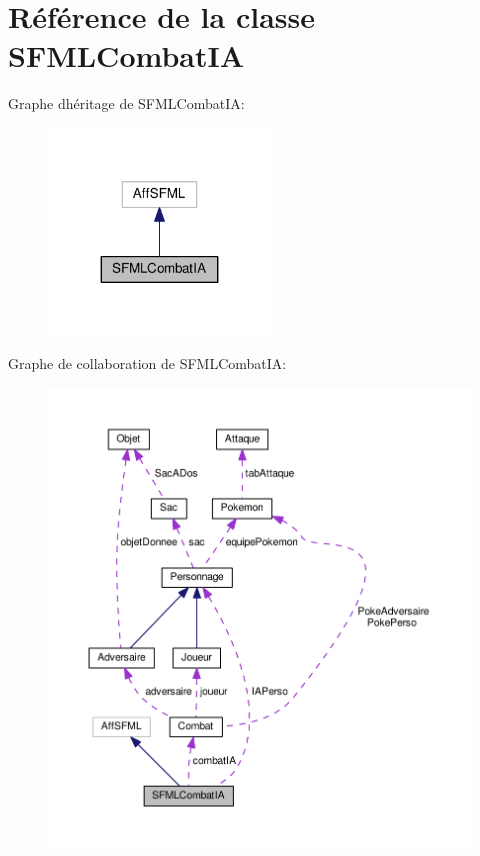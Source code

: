 \hypertarget{class_s_f_m_l_combat_i_a}{}\section{Référence de la classe S\+F\+M\+L\+Combat\+IA}
\label{class_s_f_m_l_combat_i_a}


Graphe d\textquotesingle{}héritage de S\+F\+M\+L\+Combat\+IA\+:\nopagebreak
\begin{figure}[H]
\begin{center}
\leavevmode
\includegraphics[width=167pt]{class_s_f_m_l_combat_i_a__inherit__graph}
\end{center}
\end{figure}


Graphe de collaboration de S\+F\+M\+L\+Combat\+IA\+:\nopagebreak
\begin{figure}[H]
\begin{center}
\leavevmode
\includegraphics[width=350pt]{class_s_f_m_l_combat_i_a__coll__graph}
\end{center}
\end{figure}
